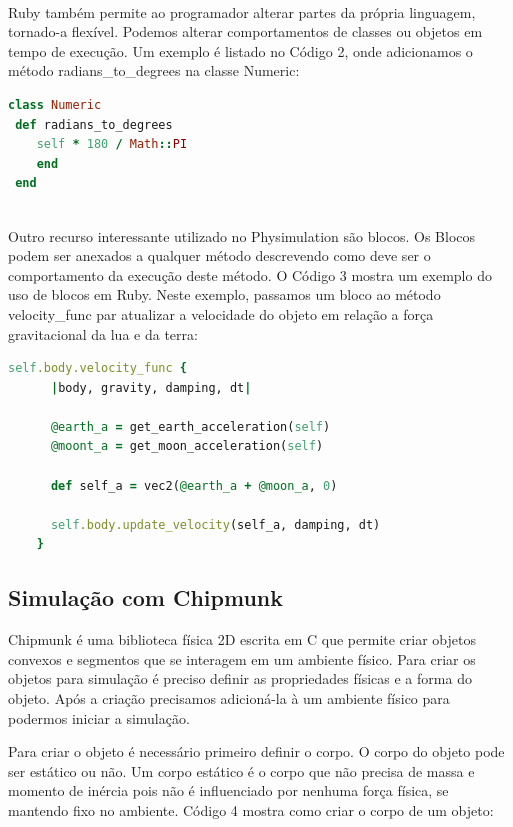 \ \\
Ruby também permite ao programador alterar partes da própria linguagem, tornado-a flexível. Podemos alterar comportamentos de classes ou objetos 
em tempo de execução. Um exemplo é listado no Código 2, onde adicionamos o método radians\_to\_degrees na classe Numeric: 

\begin{lstlisting}[language=Ruby, caption=physics.rb ]
class Numeric
 def radians_to_degrees
    self * 180 / Math::PI
    end
 end
\end{lstlisting} 

\ \\
Outro recurso interessante utilizado no Physimulation são blocos. Os Blocos podem ser anexados a qualquer método descrevendo como deve ser 
o comportamento da execução deste método. O Código 3 mostra um exemplo do uso de blocos em Ruby. Neste exemplo, passamos um bloco ao método velocity\_func 
par atualizar a velocidade do objeto em relação a força gravitacional da lua e da terra:

\begin{lstlisting}[language=Ruby, caption=RocketSimulation.rb]
    self.body.velocity_func { 
      |body, gravity, damping, dt|

      @earth_a = get_earth_acceleration(self)
      @moont_a = get_moon_acceleration(self)

      def self_a = vec2(@earth_a + @moon_a, 0)

      self.body.update_velocity(self_a, damping, dt)
    }
\end{lstlisting}

\subsection{Simulação com Chipmunk}
Chipmunk é uma biblioteca física 2D escrita em C que permite criar objetos convexos e segmentos que se interagem em um ambiente físico. Para criar os 
objetos para simulação é preciso definir as propriedades físicas e a forma do objeto. Após a criação precisamos adicioná-la à um ambiente físico para podermos 
iniciar a simulação.

Para criar o objeto é necessário primeiro definir o corpo. O corpo do objeto pode ser estático ou não. Um corpo estático é o corpo que não precisa de
massa e momento de inércia pois não é influenciado por nenhuma força física, se mantendo fixo no ambiente. Código 4 mostra como criar o corpo de um objeto:

